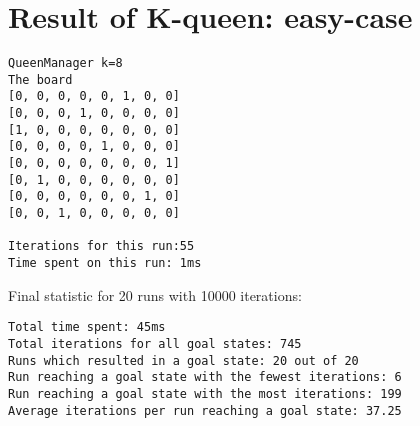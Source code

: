 \documentclass[12pt, a4paper]{article}
\begin{document}
\section{Result of K-queen: easy-case}
\begin{verbatim}
QueenManager k=8
The board 
[0, 0, 0, 0, 0, 1, 0, 0]
[0, 0, 0, 1, 0, 0, 0, 0]
[1, 0, 0, 0, 0, 0, 0, 0]
[0, 0, 0, 0, 1, 0, 0, 0]
[0, 0, 0, 0, 0, 0, 0, 1]
[0, 1, 0, 0, 0, 0, 0, 0]
[0, 0, 0, 0, 0, 0, 1, 0]
[0, 0, 1, 0, 0, 0, 0, 0]

Iterations for this run:55
Time spent on this run: 1ms
\end{verbatim}

Final statistic for 20 runs with 10000 iterations:
\begin{verbatim}
Total time spent: 45ms
Total iterations for all goal states: 745
Runs which resulted in a goal state: 20 out of 20
Run reaching a goal state with the fewest iterations: 6
Run reaching a goal state with the most iterations: 199
Average iterations per run reaching a goal state: 37.25
\end{verbatim}
\end{document}
